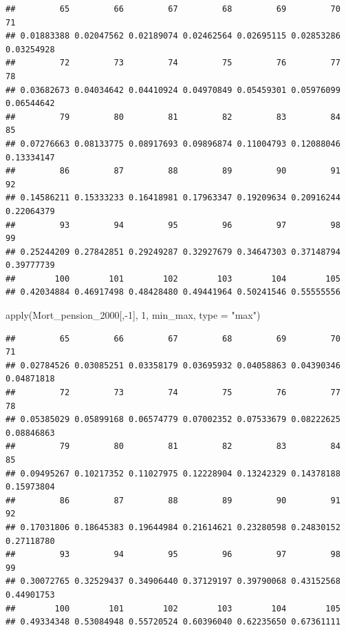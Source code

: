 \documentclass[
]{book}
\newenvironment{Shaded}{\begin{snugshade}}{\end{snugshade}}
\newcommand{\AttributeTok}[1]{\textcolor[rgb]{0.77,0.63,0.00}{#1}}
\newcommand{\DecValTok}[1]{\textcolor[rgb]{0.00,0.00,0.81}{#1}}
\newcommand{\FunctionTok}[1]{\textcolor[rgb]{0.00,0.00,0.00}{#1}}
\newcommand{\NormalTok}[1]{#1}
\newcommand{\SpecialCharTok}[1]{\textcolor[rgb]{0.00,0.00,0.00}{#1}}
\newcommand{\StringTok}[1]{\textcolor[rgb]{0.31,0.60,0.02}{#1}}
\theoremstyle{definition}
\theoremstyle{definition}
\theoremstyle{definition}
\theoremstyle{definition}
\theoremstyle{remark}
\begin{document}
\begin{verbatim}
##         65         66         67         68         69         70         71 
## 0.01883388 0.02047562 0.02189074 0.02462564 0.02695115 0.02853286 0.03254928 
##         72         73         74         75         76         77         78 
## 0.03682673 0.04034642 0.04410924 0.04970849 0.05459301 0.05976099 0.06544642 
##         79         80         81         82         83         84         85 
## 0.07276663 0.08133775 0.08917693 0.09896874 0.11004793 0.12088046 0.13334147 
##         86         87         88         89         90         91         92 
## 0.14586211 0.15333233 0.16418981 0.17963347 0.19209634 0.20916244 0.22064379 
##         93         94         95         96         97         98         99 
## 0.25244209 0.27842851 0.29249287 0.32927679 0.34647303 0.37148794 0.39777739 
##        100        101        102        103        104        105 
## 0.42034884 0.46917498 0.48428480 0.49441964 0.50241546 0.55555556
\end{verbatim}

\begin{Shaded}
\begin{Highlighting}[]
\FunctionTok{apply}\NormalTok{(Mort\_pension\_2000[,}\SpecialCharTok{{-}}\DecValTok{1}\NormalTok{], }\DecValTok{1}\NormalTok{, min\_max, }\AttributeTok{type =} \StringTok{"max"}\NormalTok{)}
\end{Highlighting}
\end{Shaded}

\begin{verbatim}
##         65         66         67         68         69         70         71 
## 0.02784526 0.03085251 0.03358179 0.03695932 0.04058863 0.04390346 0.04871818 
##         72         73         74         75         76         77         78 
## 0.05385029 0.05899168 0.06574779 0.07002352 0.07533679 0.08222625 0.08846863 
##         79         80         81         82         83         84         85 
## 0.09495267 0.10217352 0.11027975 0.12228904 0.13242329 0.14378188 0.15973804 
##         86         87         88         89         90         91         92 
## 0.17031806 0.18645383 0.19644984 0.21614621 0.23280598 0.24830152 0.27118780 
##         93         94         95         96         97         98         99 
## 0.30072765 0.32529437 0.34906440 0.37129197 0.39790068 0.43152568 0.44901753 
##        100        101        102        103        104        105 
## 0.49334348 0.53084948 0.55720524 0.60396040 0.62235650 0.67361111
\end{verbatim}
\end{document}
